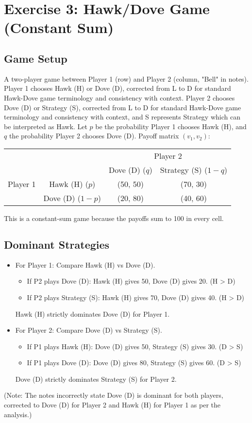 \documentclass{article}
\begin{document}
\section{Exercise 3: Hawk/Dove Game (Constant Sum)}

\subsection{Game Setup}
A two-player game between Player 1 (row) and Player 2 (column, "Bell" in notes). Player 1 chooses Hawk (H) or Dove (D), corrected from L to D for standard Hawk-Dove game terminology and consistency with context. Player 2 chooses Dove (D) or Strategy (S), corrected from L to D for standard Hawk-Dove game terminology and consistency with context, and S represents Strategy which can be interpreted as Hawk.
Let $p$ be the probability Player 1 chooses Hawk (H), and $q$ the probability Player 2 chooses Dove (D).
Payoff matrix $(v_1, v_2)$:
\begin{center}
\begin{tabular}{cc|c|c|}
  & \multicolumn{1}{c}{} & \multicolumn{2}{c}{Player 2} \\
  & \multicolumn{1}{c}{} & \multicolumn{1}{c}{Dove (D) ($q$)} & \multicolumn{1}{c}{Strategy (S) ($1-q$)} \\ \cline{3-4}
  Player 1 & Hawk (H) ($p$) & (50, 50) & (70, 30) \\ \cline{3-4}
  & Dove (D) ($1-p$) & (20, 80) & (40, 60) \\ \cline{3-4}
\end{tabular}
\end{center}
This is a constant-sum game because the payoffs sum to 100 in every cell.

\subsection{Dominant Strategies}
\begin{itemize}
    \item For Player 1: Compare Hawk (H) vs Dove (D).
        \begin{itemize}
            \item If P2 plays Dove (D): Hawk (H) gives 50, Dove (D) gives 20. (H > D)
            \item If P2 plays Strategy (S): Hawk (H) gives 70, Dove (D) gives 40. (H > D)
        \end{itemize}
        Hawk (H) strictly dominates Dove (D) for Player 1.
    \item For Player 2: Compare Dove (D) vs Strategy (S).
        \begin{itemize}
            \item If P1 plays Hawk (H): Dove (D) gives 50, Strategy (S) gives 30. (D > S)
            \item If P1 plays Dove (D): Dove (D) gives 80, Strategy (S) gives 60. (D > S)
        \end{itemize}
        Dove (D) strictly dominates Strategy (S) for Player 2.
\end{itemize}
(Note: The notes incorrectly state Dove (D) is dominant for both players, corrected to Dove (D) for Player 2 and Hawk (H) for Player 1 as per the analysis.)
\end{document}
